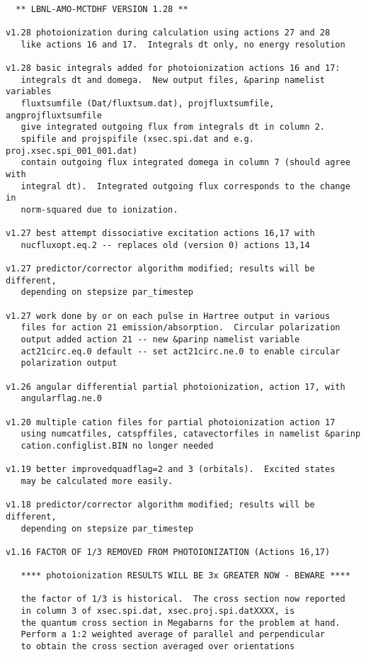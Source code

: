 \begin{verbatim}

  ** LBNL-AMO-MCTDHF VERSION 1.28 **

v1.28 photoionization during calculation using actions 27 and 28
   like actions 16 and 17.  Integrals dt only, no energy resolution

v1.28 basic integrals added for photoionization actions 16 and 17:
   integrals dt and domega.  New output files, &parinp namelist variables
   fluxtsumfile (Dat/fluxtsum.dat), projfluxtsumfile, angprojfluxtsumfile 
   give integrated outgoing flux from integrals dt in column 2.
   spifile and projspifile (xsec.spi.dat and e.g. proj.xsec.spi_001_001.dat)
   contain outgoing flux integrated domega in column 7 (should agree with 
   integral dt).  Integrated outgoing flux corresponds to the change in 
   norm-squared due to ionization.

v1.27 best attempt dissociative excitation actions 16,17 with
   nucfluxopt.eq.2 -- replaces old (version 0) actions 13,14

v1.27 predictor/corrector algorithm modified; results will be different,
   depending on stepsize par_timestep

v1.27 work done by or on each pulse in Hartree output in various
   files for action 21 emission/absorption.  Circular polarization
   output added action 21 -- new &parinp namelist variable 
   act21circ.eq.0 default -- set act21circ.ne.0 to enable circular 
   polarization output

v1.26 angular differential partial photoionization, action 17, with
   angularflag.ne.0

v1.20 multiple cation files for partial photoionization action 17
   using numcatfiles, catspffiles, catavectorfiles in namelist &parinp
   cation.configlist.BIN no longer needed

v1.19 better improvedquadflag=2 and 3 (orbitals).  Excited states
   may be calculated more easily.

v1.18 predictor/corrector algorithm modified; results will be different,
   depending on stepsize par_timestep

v1.16 FACTOR OF 1/3 REMOVED FROM PHOTOIONIZATION (Actions 16,17)

   **** photoionization RESULTS WILL BE 3x GREATER NOW - BEWARE ****

   the factor of 1/3 is historical.  The cross section now reported
   in column 3 of xsec.spi.dat, xsec.proj.spi.datXXXX, is
   the quantum cross section in Megabarns for the problem at hand.
   Perform a 1:2 weighted average of parallel and perpendicular
   to obtain the cross section averaged over orientations


\end{verbatim}
